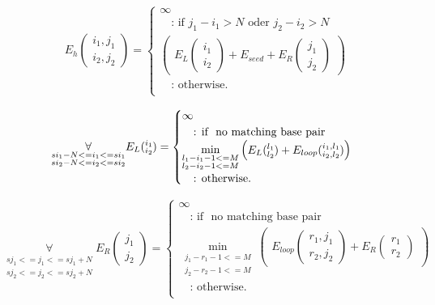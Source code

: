 \begin{equation*}
E_h(\substack{i_1,j_1\\i_2,j_2}) = \begin{cases}
\infty\\
\quad\text{: if } j_{1} - i_{1} > N \text{ oder } j_{2} - i_{2} > N\\
\begin{pmatrix}
E_{L}(\substack{i_1\\i_2}) + E_{seed} + E_{R}(\substack{j_1\\j_2})
\end{pmatrix}\\
\quad\text{: otherwise.}\\
\end{cases}
\end{equation*}

\begin{equation*}
\underset{\substack{si_{1}-N <= i_{1} <= si_{1}\\si_{2}-N <= i_{2} <= si_{2}}}{\forall}\\
E_L(\substack{i_1\\i_2}) = \begin{cases}
\infty\\
\quad\text{: if } \text{ no matching base pair }\\
\min\limits_{\substack{l_{1} - i_{1} - 1 <= M\\l_{2} - i_{2} - 1 <= M}}
\begin{pmatrix}
E_L(\substack{l_1\\l_2}) + E_{loop}(\substack{i_1,l_1\\i_2,l_2})
\end{pmatrix}\\
\quad\text{: otherwise.}\\

\end{cases}
\end{equation*}

\begin{equation*}
\underset{\substack{sj_{1} <= j_{1} <= sj_{1}+N\\sj_{2} <= j_{2} <= sj_{2}+N}}{\forall}
E_R(\substack{j_1\\j_2}) = \begin{cases}
\infty\\
\quad\text{: if } \text{ no matching base pair }\\
\min\limits_{\substack{j_{1}-r_{1}-1 <= M\\j_{2}-r_{2}-1 <= M}}
\begin{pmatrix}
E_{loop}(\substack{r_1,j_1\\r_2,j_2}) + E_R(\substack{r_1\\r_2})
\end{pmatrix}\\
\quad\text{: otherwise.}\\

\end{cases}
\end{equation*}

